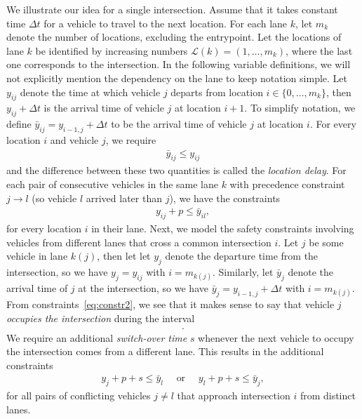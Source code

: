 \documentclass{article}
\begin{document}

We illustrate our idea for a single intersection. Assume that it takes constant
time $\Delta t$ for a vehicle to travel to the next location. For each lane $k$,
let $m_{k}$ denote the number of locations, excluding the entrypoint. Let the
locations of lane $k$ be identified by increasing numbers
$\mathcal{L}(k) = (1, \dots , m_{k})$, where the last one corresponds to the
intersection. In the following variable definitions, we will not
explicitly mention the dependency on the lane to keep notation simple. Let
$y_{ij}$ denote the time at which vehicle $j$ departs from location
$i \in \{ 0, \dots, m_{k} \}$, then $y_{ij} + \Delta t$ is the arrival time of
vehicle $j$ at location $i+1$. To simplify notation, we define
$\bar{y}_{ij} = y_{i-1,j} + \Delta t$ to be the arrival time of vehicle $j$ at
location $i$. For every location $i$ and vehicle $j$, we require
\begin{align}
  \label{eq:constr1}
  \bar{y}_{ij} \leq y_{ij}
\end{align}
and the difference between these two quantities is called the \textit{location
  delay}. For each pair of consecutive vehicles in the same lane $k$ with
precedence constraint $j \rightarrow l$ (so vehicle $l$ arrived later than $j$),
we have the constraints
\begin{align}
  \label{eq:constr2}
  y_{ij} + p \leq \bar{y}_{il} ,
\end{align}
for every location $i$ in their lane.
%
Next, we model the safety constraints involving vehicles from
different lanes that cross a common intersection $i$. Let $j$ be some vehicle in lane
$k(j)$, then let let $y_{j}$ denote the departure time from the intersection, so
we have $y_{j} = y_{ij}$ with $i=m_{k(j)}$. Similarly, let $\bar{y}_{j}$ denote
the arrival time of $j$ at the intersection, so we have
$\bar{y}_{j} = y_{i-1,j} + \Delta t$ with $i = m_{k(j)}$. From
constraints~\eqref{eq:constr2}, we see that it makes sense to say that vehicle
$j$ \textit{occupies the intersection} during the interval
\begin{align}
  [\bar{y}_{j}, y_{j} + p] .
\end{align}
We require an additional \textit{switch-over time} $s$ whenever the next vehicle
to occupy the intersection comes from a different lane.
%
This results in the additional constraints
\begin{align}
  \label{eq:3}
  y_{j} + p + s \leq \bar{y}_{l} \quad \text{ or } \quad y_{l} + p + s \leq \bar{y}_{j} ,
\end{align}
for all pairs of conflicting vehicles $j \neq l$ that approach intersection $i$
from distinct lanes.
\end{document}
